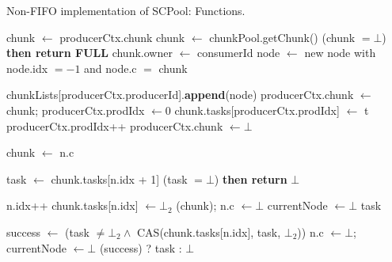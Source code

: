 \begin{algo}[!ht]
\caption{Non-FIFO implementation of SCPool: Functions.} 
\label{alg:non-fifo}
\scriptsize
\begin{minipage}[t]{0.48\textwidth}
\begin{distribalgo}[1]
\setcounter{ALC@line}{\value{alg:non-fifo:lines}}
\smallskip
{}
	\STATE chunk $\leftarrow$ producerCtx.chunk
		\STATE chunk $\leftarrow$ chunkPool.getChunk()
		 (chunk $= \bot$) {\bf then return FULL} 
		\STATE chunk.owner $\leftarrow$ consumerId
		\STATE node $\leftarrow$ new node with node.idx $=-1$ and node.c $=$ chunk
		
		\STATE chunkLists[producerCtx.producerId].{\bf append}(node)
		\STATE producerCtx.chunk $\leftarrow$ chunk; producerCtx.prodIdx $\leftarrow 0$ 
	\ENDINDENT
	\STATE chunk.tasks[producerCtx.prodIdx] $\leftarrow$ t
	\STATE producerCtx.prodIdx++
	  \STATE producerCtx.chunk $\leftarrow \bot$ 
	\ENDINDENT
\ENDINDENT

\medskip

  \STATE chunk $\leftarrow$ n.c
 
  \STATE task $\leftarrow$ chunk.tasks[n.idx + 1]
   (task $= \bot$) {\bf then return} $\bot$ 
 	
 	\smallskip 
  \STATE n.idx++ 
 		\STATE chunk.tasks[n.idx] $\leftarrow \bot_2$
  		(chunk); n.c $\leftarrow \bot$
  		\STATE currentNode $\leftarrow \bot$
  	\ENDINDENT
  	 task 
  \ENDINDENT
  
  \smallskip
 	\STATE success $\leftarrow$ (task $\neq \bot_2 \wedge $ CAS(chunk.tasks[n.idx], task, $\bot_2$))
	\STATE n.c $\leftarrow \bot$; currentNode $\leftarrow \bot$
 	 (success) ? task : $\bot$
\ENDINDENT


\end{distribalgo}
\end{minipage}
\end{algo}
